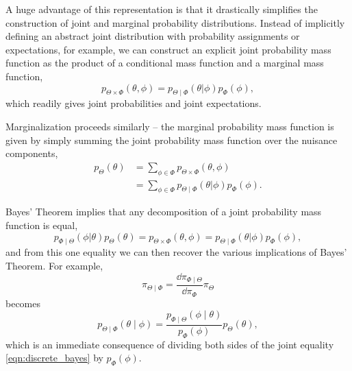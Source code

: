 A huge advantage of this representation is that it drastically simplifies the
construction of joint and marginal probability distributions.  Instead of 
implicitly defining an abstract joint distribution with probability assignments
or expectations, for example, we can construct an explicit joint probability 
mass function as the product of a conditional mass function and a marginal 
mass function,
%
\begin{equation*}
p_{\Theta \times \Phi} \! \left( \theta, \phi \right) = 
p_{\Theta \mid \Phi} \! \left( \theta | \phi \right) p_{\Phi} \! \left( \phi \right),
\end{equation*}
%
which readily gives joint probabilities and joint expectations.

Marginalization proceeds similarly -- the marginal probability mass function
is given by simply summing the joint probability mass function over the
nuisance components,
%
\begin{align*}
p_{\Theta} \! \left( \theta \right)
&= 
\sum_{\phi \in \Phi}  p_{\Theta \times \Phi} \! \left( \theta, \phi \right) \\
&=
\sum_{\phi \in \Phi}
p_{\Theta \mid \Phi} \! \left( \theta | \phi \right) p_{\Phi} \! \left( \phi \right).
\end{align*}

Bayes' Theorem implies that any decomposition of a joint probability
mass function is equal,
%
\begin{equation} \label{eqn:discrete_bayes}
p_{\Phi \mid \Theta} \! \left( \phi | \theta \right) p_{\Theta} \! \left( \theta \right)
=
p_{\Theta \times \Phi} \! \left( \theta, \phi \right) 
= 
p_{\Theta \mid \Phi} \! \left( \theta | \phi \right) p_{\Phi} \! \left( \phi \right),
\end{equation}
%
and from this one equality we can then recover the various implications of
Bayes' Theorem.  For example,
%
\begin{equation*}
\pi_{\Theta \mid \Phi} =
\frac{ \dd \pi_{\Phi \mid \Theta} }{ \dd \pi_{\Phi} }
\pi_{\Theta}
\end{equation*}
%
becomes
%
\begin{equation*}
p_{\Theta \mid \Phi} \! \left( \theta \mid \phi \right) =
\frac{ p_{\Phi \mid \Theta} \! \left( \phi \mid \theta \right) }
{ p_{\Phi} \! \left( \phi \right) }
p_{\Theta} \! \left( \theta \right),
\end{equation*}
%
which is an immediate consequence of dividing both sides of the joint
equality \eqref{eqn:discrete_bayes} by $p_{\Phi} \! \left( \phi \right)$.

